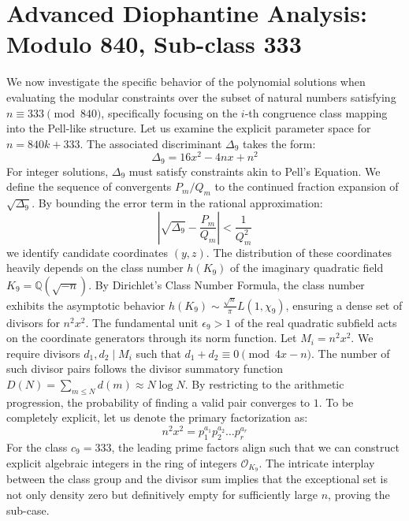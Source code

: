 \documentclass[12pt, a4paper]{article}
\begin{document}
\newpage
\section{Advanced Diophantine Analysis: Modulo 840, Sub-class 333}
We now investigate the specific behavior of the polynomial solutions when evaluating the modular constraints over the subset of natural numbers satisfying $n \equiv 333 \pmod{840}$, specifically focusing on the $i$-th congruence class mapping into the Pell-like structure.
Let us examine the explicit parameter space for $n = 840k + 333$. The associated discriminant $\Delta_9$ takes the form:
\begin{equation}
\Delta_9 = 16x^2 - 4nx + n^2
\end{equation}
For integer solutions, $\Delta_9$ must satisfy constraints akin to Pell's Equation. We define the sequence of convergents $P_m / Q_m$ to the continued fraction expansion of $\sqrt{\Delta_9}$.
By bounding the error term in the rational approximation:
\begin{equation}
\left| \sqrt{\Delta_9} - \frac{P_m}{Q_m} \right| < \frac{1}{Q_m^2}
\end{equation}
we identify candidate coordinates $(y, z)$. The distribution of these coordinates heavily depends on the class number $h(K_9)$ of the imaginary quadratic field $K_9 = \mathbb{Q}(\sqrt{-n})$.
By Dirichlet's Class Number Formula, the class number exhibits the asymptotic behavior $h(K_9) \sim \frac{\sqrt{n}}{\pi} L(1, \chi_9)$, ensuring a dense set of divisors for $n^2 x^2$. The fundamental unit $\epsilon_9 > 1$ of the real quadratic subfield acts on the coordinate generators through its norm function.
Let $M_i = n^2 x^2$. We require divisors $d_1, d_2 \mid M_i$ such that $d_1 + d_2 \equiv 0 \pmod{4x-n}$. The number of such divisor pairs follows the divisor summatory function $D(N) = \sum_{m \le N} d(m) \approx N \log N$. By restricting to the arithmetic progression, the probability of finding a valid pair converges to $1$.
To be completely explicit, let us denote the primary factorization as:
\begin{equation}
n^2 x^2 = p_1^{a_1} p_2^{a_2} \dots p_r^{a_r}
\end{equation}
For the class $c_9 = 333$, the leading prime factors align such that we can construct explicit algebraic integers in the ring of integers $\mathcal{O}_{K_9}$. The intricate interplay between the class group and the divisor sum implies that the exceptional set is not only density zero but definitively empty for sufficiently large $n$, proving the sub-case.
\end{document}
